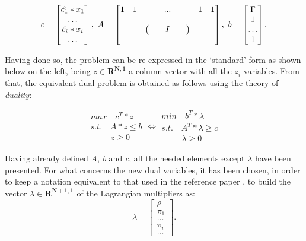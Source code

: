 \documentclass{article}
\begin{document}
\[ c=
        \begin{bmatrix}
            \hat{c_1}*x_1\\
            \dots\\
            \hat{c_i}*x_i\\
            \dots
        \end{bmatrix}, 
    ~A =
        \begin{bmatrix}
        1 & 1 & ... & 1 & 1\\
        &&&&\\
        &&\begin{pmatrix}
        &&I&&
        \end{pmatrix}&&\\
        &&&&
        \end{bmatrix},
    \\~b=
        \begin{bmatrix}
        \Gamma\\
        1\\
        \dots\\
        1
        \end{bmatrix}.
\]

Having done so, the problem can be re-expressed in the `standard' form as shown below on the left, being $z \in \mathbf{R^{N,1}}$ a column vector with all the $z_i$ variables. From that, the equivalent dual problem is obtained as follows using the theory of \emph{duality}:

\[
\begin{array}{lll}
max \quad c^T*z\\
s.t. \quad A*z \leq b\\
\quad \quad ~~ z \geq 0
\end{array}
\Leftrightarrow
\begin{array}{lll}
min \quad b^T*\lambda\\
s.t. \quad A^T*\lambda \geq c\\
\quad \quad ~~ \lambda \geq 0 
\end{array}
\]

Having already defined \emph{A}, \emph{b} and \emph{c}, all the needed elements except  $\lambda$ have been presented. For what concerns the new dual variables, it has been chosen, in order to keep a notation equivalent to that used in the reference paper \cite{Monaci}, to build the vector $\lambda \in \mathbf{R^{N+1,1}}$ of the Lagrangian multipliers as:
\[
\lambda =
\begin{bmatrix}
        \rho\\
        \pi_1\\
        \dots\\
        \pi_i\\
        \dots
        \end{bmatrix}.
\]
\end{document}
